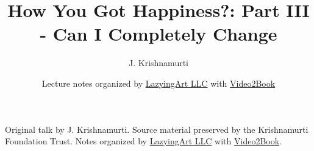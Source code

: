 \documentclass[11pt,oneside]{book}
\begin{document}
\frontmatter
\title{How You Got Happiness?: Part III - Can I Completely Change}
\author{J. Krishnamurti}
\date{Lecture notes organized by \href{https://lazying.art}{LazyingArt LLC} with \href{https://github.com/lachlanchen/Video2Book}{Video2Book}}
\maketitle
\begin{center}
\small Original talk by J. Krishnamurti. Source material preserved by the Krishnamurti Foundation Trust. Notes organized by \href{https://lazying.art}{LazyingArt LLC} with \href{https://github.com/lachlanchen/Video2Book}{Video2Book}.
\end{center}
\clearpage
\mainmatter

\end{document}
